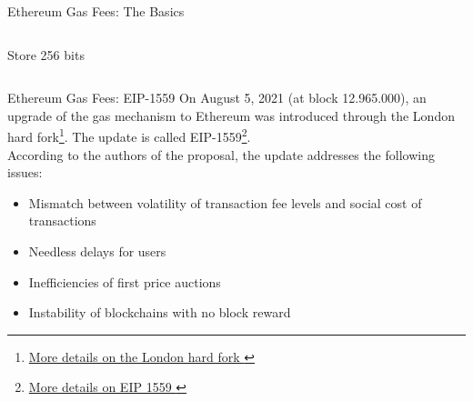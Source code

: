 \documentclass[]{beamer}
\begin{document}
\begin{frame}{Ethereum Gas Fees: The Basics}
\begin{itemize}
\begin{columns}
{\begin{column}{0.25\textwidth}
\begin{samplecode}{Store 256 bits}
					\end{samplecode}	
				\end{column}
				}
				\begin{column}{0.02\textwidth} %
				\end{column}
			\end{columns}
	\end{itemize} 
\end{frame}

\begin{frame}{Ethereum Gas Fees: EIP-1559}
	On August 5, 2021 (at block 12.965.000), an upgrade of the gas mechanism to Ethereum was introduced through the London hard fork\footnote{\href{https://ethereum.org/en/history/\#london}{More details on the London hard fork \link}}. The update is called EIP-1559\footnote{\href{https://eips.ethereum.org/EIPS/eip-1559}{More details on EIP 1559 \link}}.\\
	According to the authors of the proposal, the update addresses the following issues: %
	\begin{itemize}
		\item Mismatch between volatility of transaction fee levels and social cost of transactions
		\item Needless delays for users
		\item Inefficiencies of first price auctions
		\item Instability of blockchains with no block reward
	\end{itemize}
\end{frame}
\end{document}
